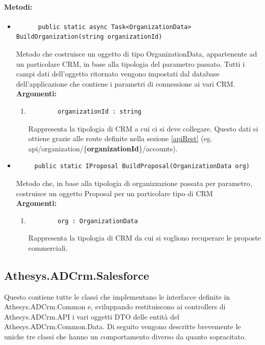 \paragraph{Metodi:}\hfill
\begin{itemize}
	\itemsep0em 
	\item 
	\begin{lstlisting}
	  public static async Task<OrganizationData> BuildOrganization(string organizationId)	
	\end{lstlisting}
	Metodo che costruisce un oggetto di tipo OrganizationData, appartenente ad un particolare CRM, in base alla tipologia del parametro passato.
	Tutti i campi dati dell'oggetto ritornato vengono impostati dal database dell'applicazione che contiene i parametri di connessione ai vari CRM.
	\\
	\textbf{\small Argomenti:}
	\begin{enumerate}[leftmargin=*]
		\itemsep0em 
		\item 
		\begin{lstlisting}
		organizationId : string
		\end{lstlisting}
		Rappresenta la tipologia di CRM a cui ci si deve collegare. Questo dati si ottiene grazie alle route definite nella sezione \ref{apiRest} (eg. api/organization/\{\textbf{organizationId}\}/accounts).
	\end{enumerate}
	
	\item 
	\begin{lstlisting}
     public static IProposal BuildProposal(OrganizationData org)
	\end{lstlisting}
	Metodo che, in base alla tipologia di organizzazione passata per parametro, costruisce un oggetto Proposal per un particolare tipo di CRM\\
	\textbf{\small Argomenti:}
	\begin{enumerate}[leftmargin=*]
		\itemsep0em
		\item 
		\begin{lstlisting}
		org : OrganizationData
		\end{lstlisting}
		Rappresenta la tipologia di CRM da cui si vogliono recuperare le proposte commerciali.
	\end{enumerate}
\end{itemize}
 
\subsection{Athesys.ADCrm.Salesforce}\label{salesforce}
Questo  contiene tutte le classi che implementano le interfacce definite in Athesys.ADCrm.Common e, sviluppando  restituiscono ai controllers di Athesys.ADCrm.API i vari oggetti DTO delle entità del  Athesys.ADCrm.Common.Data.
Di seguito vengono descritte brevemente le uniche tre classi che hanno un comportamento diverso da quanto sopracitato.

